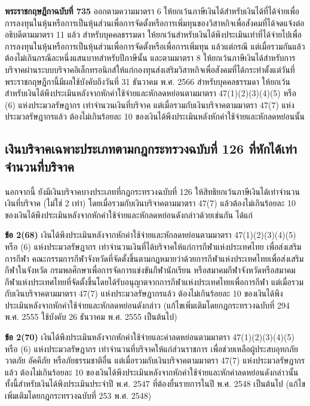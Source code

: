 \documentclass[12pt,a4paper]{article}
\begin{document}
\textbf{พระราชกฤษฎีกาฉบับที่ 735} ออกตามความมาตรา 6 ให้ยกเว้นภาษีเงินได้สำหรับเงินได้ที่ได้จ่ายเพื่อการลงทุนในหุ้นหรือการเป็นหุ้นส่วนเพื่อการจัดตั้งหรือการเพิ่มทุนของวิสาหกิจเพื่อสังคมที่ได้จดแจ้งต่ออธิบดีตามมาตรา 11 แล้ว สำหรับบุคคลธรรมดา ให้ยกเว้นสำหรับเงินได้พึงประเมินเท่าที่ได้จ่ายไปเพื่อการลงทุนในหุ้นหรือการเป็นหุ้นส่วนเพื่อการจัดตั้งหรือเพื่อการเพิ่มทุน แล้วแต่กรณี แต่เมื่อรวมกันแล้วต้องไม่เกินกรณีละหนึ่งแสนบาทสำหรับปีภาษีนั้น และตามมาตรา 8 ให้ยกเว้นภาษีเงินได้สำหรับการบริจาคผ่านระบบบริจาคอิเล็กทรอนิกส์ให้แก่กองทุนส่งเสริมวิสาหกิจเพื่อสังคมที่ได้กระทำตั้งแต่วันที่พระราชกฤษฎีกานี้มีผลใช้บังคับถึงวันที่ 31 ธันวาคม พ.ศ. 2566 สำหรับบุคคลธรรมดา ให้ยกเว้นสำหรับเงินได้พึงประเมินหลังจากหักค่าใช้จ่ายและหักลดหย่อนตามมาตรา 47(1)(2)(3)(4)(5) หรือ (6) แห่งประมวลรัษฎากร เท่าจำนวนเงินที่บริจาค แต่เมื่อรวมกับเงินบริจาคตามมาตรา 47(7) แห่งประมวลรัษฎากรแล้ว ต้องไม่เกินร้อยละ 10 ของเงินได้พึงประเมินหลังหักค่าใช้จ่ายและหักลดหย่อนนั้น

\subsection*{เงินบริจาคเฉพาะประเภทตามกฎกระทรวงฉบับที่ 126 ที่หักได้เท่าจำนวนที่บริจาค}

นอกจากนี้ ยังมีเงินบริจาคบางประเภทที่กฎกระทรวงฉบับที่ 126 ให้สิทธิยกเว้นภาษีเงินได้เท่าจำนวนเงินที่บริจาค (ไม่ใช่ 2 เท่า) โดยเมื่อรวมกับเงินบริจาคตามมาตรา 47(7) แล้วต้องไม่เกินร้อยละ 10 ของเงินได้พึงประเมินหลังจากหักค่าใช้จ่ายและหักลดหย่อนดังกล่าวด้วยเช่นกัน ได้แก่

\textbf{ข้อ 2(68)} เงินได้พึงประเมินหลังจากหักค่าใช้จ่ายและหักลดหย่อนตามมาตรา 47(1)(2)(3)(4)(5) หรือ (6) แห่งประมวลรัษฎากร เท่าจำนวนเงินที่ได้บริจาคให้แก่การกีฬาแห่งประเทศไทย เพื่อส่งเสริมการกีฬา คณะกรรมการกีฬาจังหวัดที่จัดตั้งขึ้นตามกฎหมายว่าด้วยการกีฬาแห่งประเทศไทยเพื่อส่งเสริมกีฬาในจังหวัด กรมพลศึกษาเพื่อการจัดการแข่งขันกีฬานักเรียน หรือสมาคมกีฬาจังหวัดหรือสมาคมกีฬาแห่งประเทศไทยที่จัดตั้งขึ้นโดยได้รับอนุญาตจากการกีฬาแห่งประเทศไทยเพื่อการกีฬา แต่เมื่อรวมกับเงินบริจาคตามมาตรา 47(7) แห่งประมวลรัษฎากรแล้ว ต้องไม่เกินร้อยละ 10 ของเงินได้พึงประเมินหลังจากหักค่าใช้จ่ายและหักลดหย่อนดังกล่าว (แก้ไขเพิ่มเติมโดยกฎกระทรวงฉบับที่ 294 พ.ศ. 2555 ใช้บังคับ 26 ธันวาคม พ.ศ. 2555 เป็นต้นไป)

\textbf{ข้อ 2(70)} เงินได้พึงประเมินหลังจากหักค่าใช้จ่ายและค่าลดหย่อนตามมาตรา 47(1)(2)(3)(4)(5) หรือ (6) แห่งประมวลรัษฎากร เท่าจำนวนที่บริจาคให้แก่ส่วนราชการ เพื่อช่วยเหลือผู้ประสบอุทกภัย วาตภัย อัคคีภัย หรือภัยธรรมชาติอื่น แต่เมื่อรวมกับเงินบริจาคตามมาตรา 47(7) แห่งประมวลรัษฎากรแล้ว ต้องไม่เกินร้อยละ 10 ของเงินได้พึงประเมินหลังจากหักค่าใช้จ่ายและหักค่าลดหย่อนดังกล่าวนั้น ทั้งนี้สำหรับเงินได้พึงประเมินประจำปี พ.ศ. 2547 ที่ต้องยื่นรายการในปี พ.ศ. 2548 เป็นต้นไป (แก้ไขเพิ่มเติมโดยกฎกระทรวงฉบับที่ 253 พ.ศ. 2548)
\end{document}

